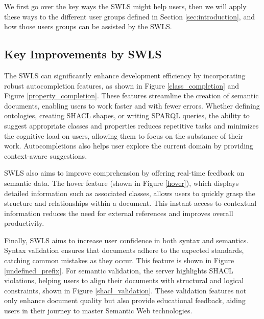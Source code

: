 We first go over the key ways the SWLS might help users, then we will apply these ways to the different user groups defined in Section \ref{sec:introduction}, 
and how those users groups can be assisted by the SWLS.

\subsection{Key Improvements by SWLS}

The SWLS can significantly enhance development efficiency by incorporating robust autocompletion features, as shown in Figure \ref{class_completion} and Figure \ref{property_completion}.
These features streamline the creation of semantic documents, enabling users to work faster and with fewer errors. 
Whether defining ontologies, creating SHACL shapes, or writing SPARQL queries, the ability to suggest appropriate classes and properties reduces repetitive tasks and minimizes the cognitive load on users, allowing them to focus on the substance of their work.
Autocompletions also helps user explore the current domain by providing context-aware suggestions.

SWLS also aims to improve comprehension by offering real-time feedback on semantic data.
The hover feature (shown in Figure \ref{hover}), which displays detailed information such as associated classes, allows users to quickly grasp the structure and relationships within a document. 
This instant access to contextual information reduces the need for external references and improves overall productivity.

Finally, SWLS aims to increase user confidence in both syntax and semantics.
Syntax validation ensures that documents adhere to the expected standards, catching common mistakes as they occur. This feature is shown in Figure \ref{undefined_prefix}.
For semantic validation, the server highlights SHACL violations, helping users to align their documents with structural and logical constraints, shown in Figure \ref{shacl_validation}. 
These validation features not only enhance document quality but also provide educational feedback, aiding users in their journey to master Semantic Web technologies.


